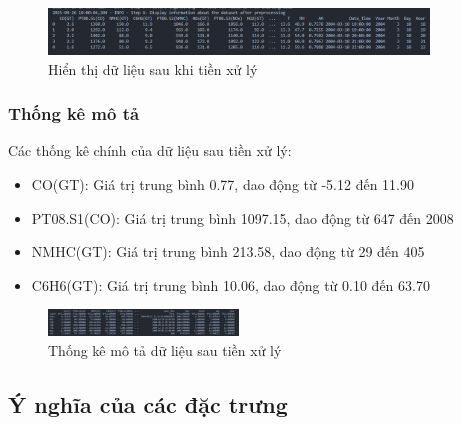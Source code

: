 \begin{figure}[htbp]
    \centering
    \includegraphics[width=0.9\textwidth]{images/processed_data_preview.png}
    \vspace{0.5cm}
    \caption{Hiển thị dữ liệu sau khi tiền xử lý}
    \label{fig:processed_data_preview}
\end{figure}

\subsubsection{Thống kê mô tả}
\hspace{0.5cm}Các thống kê chính của dữ liệu sau tiền xử lý:
\begin{itemize}
    \item CO(GT): Giá trị trung bình 0.77, dao động từ -5.12 đến 11.90
    \item PT08.S1(CO): Giá trị trung bình 1097.15, dao động từ 647 đến 2008
    \item NMHC(GT): Giá trị trung bình 213.58, dao động từ 29 đến 405
    \item C6H6(GT): Giá trị trung bình 10.06, dao động từ 0.10 đến 63.70
\end{itemize}

\begin{figure}[htbp]
    \centering
    \includegraphics[width=0.45\textwidth]{images/processed_data_statistics.png}
    \vspace{0.5cm}
    \caption{Thống kê mô tả dữ liệu sau tiền xử lý}
    \label{fig:processed_data_statistics}
\end{figure}

\subsection{Ý nghĩa của các đặc trưng}

